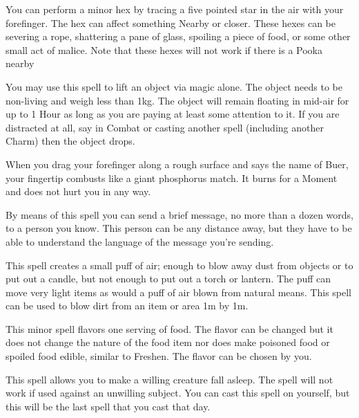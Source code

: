 {  You can perform a minor hex by tracing a five pointed star in the air with your forefinger. The hex can affect something Nearby or closer.  These hexes can be severing a rope, shattering a pane of glass, spoiling a piece of food, or some other small act of malice.  Note that these hexes will not work if there is a Pooka nearby


  You may use this spell to lift an object via magic alone. The object needs to be non-living and weigh less than 1kg. The object will remain floating in mid-air for up to 1 Hour as long as you are paying at least some attention to it. If you are distracted at all, say in Combat or casting another spell (including another Charm) then the object drops. 


  When you drag your forefinger along a rough surface and says the name of Buer, your fingertip combusts like a giant phosphorus match. It burns for a Moment and does not hurt you in any way.


  By means of this spell you can send a brief message, no more than a dozen words, to a person you know. This person can be any distance away, but they have to be able to understand the language of the message you're sending.


  This spell creates a small puff of air; enough to blow away dust from objects or to put out a candle, but not enough to put out a torch or lantern. The puff can move very light items as would a puff of air blown from natural means. This spell can be used to blow dirt from an item or area 1m by 1m. 


  This minor spell flavors one serving of food. The flavor can be changed but it does not change the nature of the food item nor does make poisoned food or spoiled food edible, similar to Freshen. The flavor can be chosen by you. 

  This spell allows you to make a willing creature fall asleep. The spell will not work if used against an unwilling subject. You can cast this spell on yourself, but this will be the last spell that you cast that day.

}

